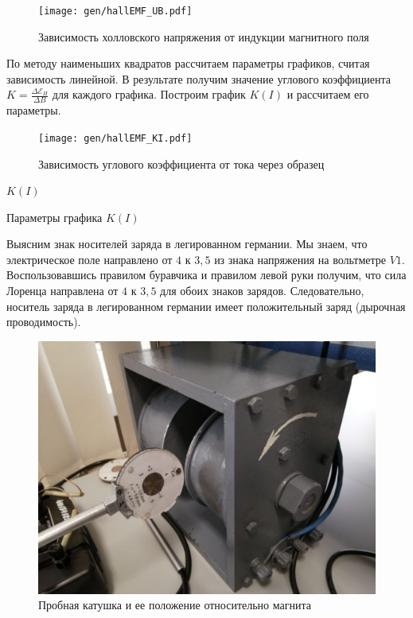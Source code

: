\documentclass[12pt,a4paper]{article}
\begin{document}
	\begin{figure}[H]
		\texttt{[image: gen/hallEMF\_UB.pdf]}
		\caption{Зависимость холловского напряжения от индукции магнитного поля}
	\end{figure}

	По методу наименьших квадратов рассчитаем параметры графиков, считая зависимость линейной. В результате получим значение углового коэффициента $K = \frac{\Delta \mathcal{E}_H}{\Delta B}$ для каждого графика. Построим график $K(I)$ и рассчитаем его параметры.
	
	\begin{figure}[H]
		\texttt{[image: gen/hallEMF\_KI.pdf]}
		\caption{Зависимость углового коэффициента от тока через образец}
	\end{figure}
	
	\begin{table}[h]
		\caption{$K(I)$}
		
	\end{table}
	
	\begin{table}[h]
		\caption{Параметры графика $K(I)$}
		
	\end{table}

	Выясним знак носителей заряда в легированном германии. Мы знаем, что электрическое поле направлено от $4$ к $3,5$ из знака напряжения на вольтметре $V1$. Воспользовавшись правилом буравчика и правилом левой руки получим, что сила Лоренца направлена от $4$ к $3,5$ для обоих знаков зарядов. Следовательно, носитель заряда в легированном германии имеет положительный заряд (дырочная проводимость).
	
	\begin{figure}[H]
		\includegraphics[scale = 0.25]{res/probe_coil.jpg}
		\caption{Пробная катушка и ее положение относительно магнита}
	\end{figure}
	
\end{document}

